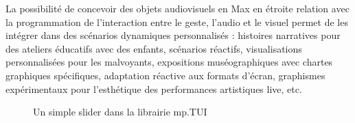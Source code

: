\noindent La possibilité de concevoir des objets audiovisuels en Max en étroite relation avec la programmation de l'interaction entre le geste, l'audio et le visuel permet de les intégrer dans des scénarios dynamiques personnalisés : histoires narratives pour des ateliers éducatifs avec des enfants, scénarios réactifs, visualisations personnalisées pour les malvoyants, expositions muséographiques avec chartes graphiques spécifiques, adaptation réactive aux formats d'écran, graphismes expérimentaux pour l'esthétique des performances artistiques live, etc.
\begin{figure}[!htbp]
	\caption{Un simple slider dans la librairie mp.TUI}
\end{figure}

